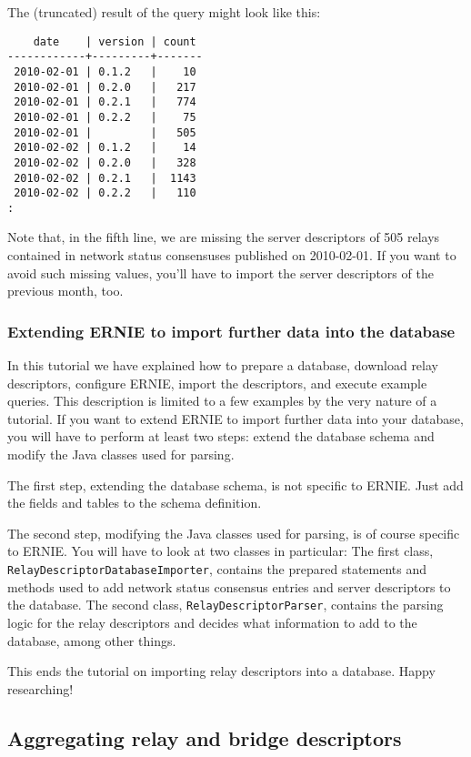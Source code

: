 \documentclass{article}
\begin{document}
The (truncated) result of the query might look like this:

\begin{verbatim}
    date    | version | count
------------+---------+-------
 2010-02-01 | 0.1.2   |    10
 2010-02-01 | 0.2.0   |   217
 2010-02-01 | 0.2.1   |   774
 2010-02-01 | 0.2.2   |    75
 2010-02-01 |         |   505
 2010-02-02 | 0.1.2   |    14
 2010-02-02 | 0.2.0   |   328
 2010-02-02 | 0.2.1   |  1143
 2010-02-02 | 0.2.2   |   110
:
\end{verbatim}

Note that, in the fifth line, we are missing the server descriptors of 505
relays contained in network status consensuses published on 2010-02-01.
If you want to avoid such missing values, you'll have to import the server
descriptors of the previous month, too.

\subsubsection{Extending ERNIE to import further data into the database}

In this tutorial we have explained how to prepare a database, download
relay descriptors, configure ERNIE, import the descriptors, and execute
example queries.
This description is limited to a few examples by the very nature of a
tutorial.
If you want to extend ERNIE to import further data into your database,
you will have to perform at least two steps:
extend the database schema and modify the Java classes used for parsing.

The first step, extending the database schema, is not specific to ERNIE.
Just add the fields and tables to the schema definition.

The second step, modifying the Java classes used for parsing, is of course
specific to ERNIE.
You will have to look at two classes in particular:
The first class, \verb+RelayDescriptorDatabaseImporter+, contains the
prepared statements and methods used to add network status consensus
entries and server descriptors to the database.
The second class, \verb+RelayDescriptorParser+, contains the parsing logic
for the relay descriptors and decides what information to add to the
database, among other things.

This ends the tutorial on importing relay descriptors into a database.
Happy researching!

\subsection{Aggregating relay and bridge descriptors}
\end{document}
